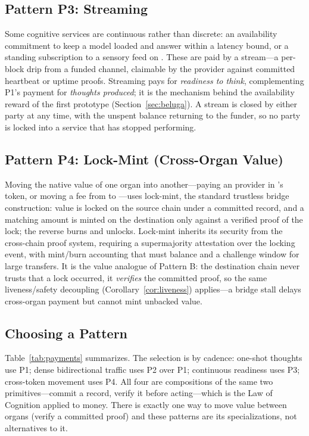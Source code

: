 \subsection{Pattern P3: Streaming}

Some cognitive services are continuous rather than discrete: an availability commitment to keep a model loaded and answer within a latency bound, or a standing subscription to a sensory feed on \SChain{}. These are paid by a stream---a per-block drip from a funded channel, claimable by the provider against committed heartbeat or uptime proofs. Streaming pays for \emph{readiness to think}, complementing P1's payment for \emph{thoughts produced}; it is the mechanism behind the availability reward of the first prototype (Section~\ref{sec:beluga}). A stream is closed by either party at any time, with the unspent balance returning to the funder, so no party is locked into a service that has stopped performing.

\subsection{Pattern P4: Lock-Mint (Cross-Organ Value)}

Moving the native value of one organ into another---paying an \AChain{} provider in \CChain{}'s token, or moving a fee from \GChain{} to \DChain{}---uses lock-mint, the standard trustless bridge construction: value is locked on the source chain under a committed record, and a matching amount is minted on the destination only against a verified proof of the lock; the reverse burns and unlocks. Lock-mint inherits its security from the cross-chain proof system, requiring a supermajority attestation over the locking event, with mint/burn accounting that must balance and a challenge window for large transfers. It is the value analogue of Pattern B: the destination chain never trusts that a lock occurred, it \emph{verifies} the committed proof, so the same liveness/safety decoupling (Corollary~\ref{cor:liveness}) applies---a bridge stall delays cross-organ payment but cannot mint unbacked value.

\subsection{Choosing a Pattern}

Table~\ref{tab:payments} summarizes. The selection is by cadence: one-shot thoughts use P1; dense bidirectional traffic uses P2 over P1; continuous readiness uses P3; cross-token movement uses P4. All four are compositions of the same two primitives---commit a record, verify it before acting---which is the Law of Cognition applied to money. There is exactly one way to move value between organs (verify a committed proof) and these patterns are its specializations, not alternatives to it.

